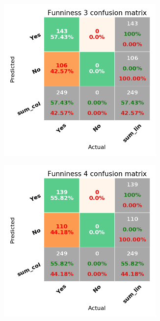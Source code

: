 \documentclass[draft,final,oneside]{vutinfth} %
\begin{document}
\begin{figure}
\begin{subfigure}[b]{0.45\textwidth}
\centering
\includegraphics[width=0.9\textwidth,height=0.3\textheight,keepaspectratio]{graphics/twostageperf/funniness3}
\end{subfigure}\quad
\begin{subfigure}[b]{0.45\textwidth}
\centering
\includegraphics[width=0.9\textwidth,height=0.3\textheight,keepaspectratio]{graphics/twostageperf/funniness4}
\end{subfigure}


\end{figure}
\end{document}
